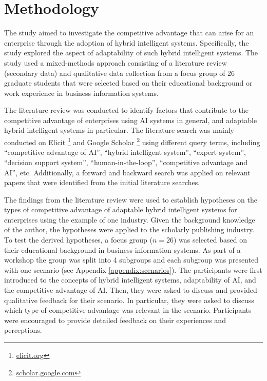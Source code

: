 \section{Methodology}
\label{sec:methods}

The study aimed to investigate the competitive advantage that can arise for an enterprise
through the adoption of hybrid intelligent systems. Specifically, the study explored the aspect of adaptability
of such hybrid intelligent systems. The study used a mixed-methods approach consisting of a literature
review (secondary data) and qualitative data collection from a focus group of 26 graduate students that 
were selected based on their educational background or work experience in business information systems.

The literature review was conducted to identify factors that contribute to the competitive advantage
of enterprises using AI systems in general, and adaptable hybrid intelligent systems in particular.
The literature search was mainly conducted on Elicit \footnote{\href{https://elicit.org/}{elicit.org}}
and Google Scholar \footnote{\href{https://scholar.google.com/}{scholar.google.com}} using different
query terms, including ``competitive advantage of AI'', ``hybrid intelligent system'',
``expert system'', ``decision support system'', ``human-in-the-loop'', ``competitive advantage and AI'',
etc. Additionally, a forward and backward search was applied on relevant papers that were identified
from the initial literature searches.

The findings from the literature review were used to establish hypotheses on the types of competitive
advantage of adaptable hybrid intelligent systems for enterprises using the example of one industry. Given the
background knowledge of the author, the hypotheses were applied to the scholarly publishing industry.
To test the derived hypotheses, a focus group ($n = 26$) was selected based on their educational
background in business information systems. As part of a workshop the group was split into 4 subgroups and 
each subgroup was presented with one scenario (see Appendix \ref{appendix:scenarios}). The participants were
first introduced to the concepts of hybrid intelligent systems, adaptability of AI, and the competitive advantage
of AI. Then, they were asked to discuss and provided qualitative feedback for their scenario. In particular, 
they were asked to discuss which type of competitive advantage was relevant in the scenario. Participants
were encouraged to provide detailed feedback on their experiences and perceptions.
